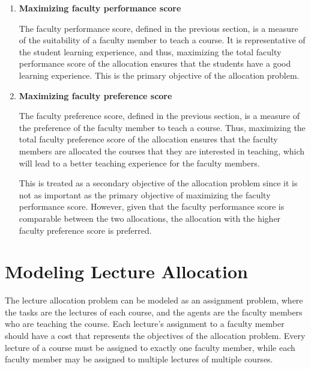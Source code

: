 \begin{enumerate}
  \item \textbf{Maximizing faculty performance score}

        The faculty performance score, defined in the previous section, is a measure of the suitability of a faculty member to teach a course. It is representative of the student learning experience, and thus, maximizing the total faculty performance score of the allocation ensures that the students have a good learning experience. This is the primary objective of the allocation problem.

  \item \textbf{Maximizing faculty preference score}

        The faculty preference score, defined in the previous section, is a measure of the preference of the faculty member to teach a course. Thus, maximizing the total faculty preference score of the allocation ensures that the faculty members are allocated the courses that they are interested in teaching, which will lead to a better teaching experience for the faculty members.

        This is treated as a secondary objective of the allocation problem since it is not as important as the primary objective of maximizing the faculty performance score. However, given that the faculty performance score is comparable between the two allocations, the allocation with the higher faculty preference score is preferred.

\end{enumerate}

\section{Modeling Lecture Allocation}
\label{sec:modeling_lecture_allocation}

The lecture allocation problem can be modeled as an assignment problem, where the tasks are the lectures of each course, and the agents are the faculty members who are teaching the course. Each lecture's assignment to a faculty member should have a cost that represents the objectives of the allocation problem. Every lecture of a course must be assigned to exactly one faculty member, while each faculty member may be assigned to multiple lectures of multiple courses.

